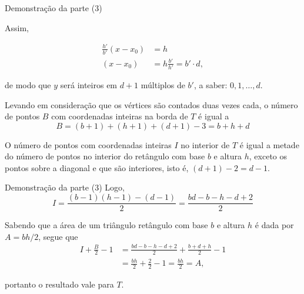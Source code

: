 \begin{frame}[fragile]{Demonstração da parte (3)}

    Assim,

    \begin{align*}
        \frac{h'}{b'}(x - x_0) &= h\\
        (x - x_0) &= h\frac{b'}{h'} = b'\cdot d,
    \end{align*}

    de modo que $y$ será inteiros em $d + 1$ múltiplos de $b'$, a saber: $0, 1, \ldots, d$.

    Levando em consideração que os vértices são contados duas vezes cada, o número de pontos $B$
    com coordenadas inteiras na borda de $T$ é igual a
    \[
        B = (b + 1) + (h + 1) + (d + 1) - 3 = b + h + d
    \]

    O número de pontos com coordenadas inteiras $I$ no interior de $T$ é igual a metade do
    número de pontos no interior do retângulo com base $b$ e altura $h$, exceto os pontos sobre
    a diagonal e que são interiores, isto é, $(d + 1) - 2 = d - 1$.
\end{frame}

\begin{frame}[fragile]{Demonstração da parte (3)}
    Logo,
    \[
        I = \frac{(b - 1)(h - 1) - (d - 1)}{2} = \frac{bd - b - h - d + 2}{2}
    \]

    Sabendo que a área de um triângulo retângulo com base $b$ e altura $h$ é dada por
    $A = bh/2$, segue que
    \begin{align*}
        I + \frac{B}{2} - 1 &= \frac{bd - b - h - d + 2}{2} + \frac{b + d + h}{2} - 1 \\
        &= \frac{bh}{2} + \frac{2}{2} - 1 = \frac{bh}{2} = A,
    \end{align*}

    portanto o resultado vale para $T$.
\end{frame}
